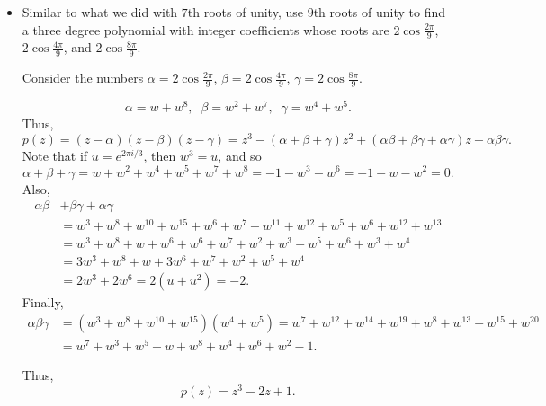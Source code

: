 \documentclass[11pt,dvipsnames]{book}
\numberwithin{equation}{section} %
\numberwithin{figure}{section} %
\numberwithin{table}{section} %
\begin{document}
\begin{exercise}
\begin{itemize}
\item Similar to what we did with $7$th roots of unity, use $9$th roots of unity to find a three degree polynomial with integer coefficients whose roots are $ 2 \cos \frac{2\pi}{9}$, $ 2\cos \frac{4\pi}{9}$, and $ 2\cos \frac{8\pi }{9}$.

\begin{solution}
Consider the numbers $\alpha = 2 \cos \frac{2\pi}{9}$, $\beta = 2\cos \frac{4\pi}{9}$, $\gamma = 2\cos \frac{8\pi }{9}$.

\[
\alpha = w+w^8, \;\; \beta = w^2+w^7, \;\; \gamma = w^4+w^5.
\]
Thus,
\[
p(z)
=(z-\alpha)(z-\beta)(z-\gamma)
 = z^3 -(\alpha+\beta+\gamma)z^2 +(\alpha\beta+\beta\gamma+\alpha\gamma)z-\alpha\beta\gamma.
 \]
 Note that if $u=e^{2\pi i/3}$, then $w^3=u$, and so 
 \[
 \alpha+\beta+\gamma=w+w^2+w^4+w^5+w^7+w^8
 =-1-w^3-w^6 = -1-w-w^2
 =0.
 \]
 Also,
 \begin{align*}
 \alpha\beta & +\beta\gamma+\alpha\gamma\\
& =w^3+w^8+w^{10}+w^{15} +w^6+w^7+w^{11}+w^{12} + w^5+w^6+w^{12}+w^{13}\\
& = w^3+w^8+w+w^{6} +w^6+w^7+w^{2}+w^{3} + w^5+w^6+w^{3}+w^{4}\\
& = 3w^3+w^8+w+3w^6+w^7+w^2+w^5+w^4 \\
& = 2w^3+2w^6=2(u+u^2)=-2.
 \end{align*}
 Finally,
 \begin{align*}
 \alpha\beta\gamma 
 & = (w^3+w^8+w^{10}+w^{15})(w^4+w^5)
 =w^7+w^{12}+w^{14}+w^{19}+w^8+w^{13}+w^{15}+w^{20}\\
 & = w^7+w^3+w^5+w+w^8+w^4+w^6+w^2
 -1.
 \end{align*}
 
 Thus, 
 \[
 p(z) = z^3-2z+1.
 \]
 
 
 

\end{solution}
\end{itemize}


\end{exercise}
\end{document}
